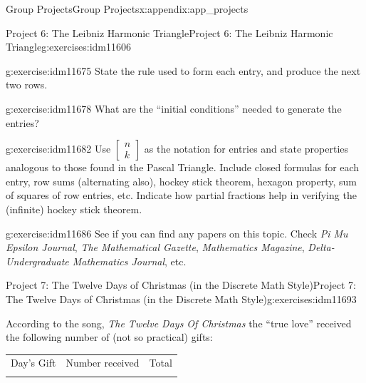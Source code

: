 \documentclass[oneside,10pt,]{book}
\numberwithin{equation}{chapter}
\newcommand{\hrulemedium}{\noalign{\hrule height 0.07em}}
\begin{document}
\begin{appendixptx}{Group Projects}{}{Group Projects}{}{}{x:appendix:app_projects}
\begin{exercises-section-numberless}{Project 6: The Leibniz Harmonic Triangle}{}{Project 6: The Leibniz Harmonic Triangle}{}{}{g:exercises:idm11606}
\begin{sidebyside}{1}{0}{0}{0}
\begin{sbspanel}{1}
{\par}
\end{sbspanel}%
\end{sidebyside}%
\begin{divisionexercise}{1}{}{}{g:exercise:idm11675}%
State the rule used to form each entry, and produce the next two rows.%
\end{divisionexercise}%
\begin{divisionexercise}{2}{}{}{g:exercise:idm11678}%
What are the ``initial conditions'' needed to generate the entries?%
\end{divisionexercise}%
\begin{divisionexercise}{3}{}{}{g:exercise:idm11682}%
Use \(\begin{bmatrix} n\\ k \end{bmatrix}\) as the notation for entries and state properties analogous to those found in the Pascal Triangle. Include closed formulas for each entry, row sums (alternating also), hockey stick theorem, hexagon property, sum of squares of row entries, etc. Indicate how partial fractions help in verifying the (infinite) hockey stick theorem.%
\end{divisionexercise}%
\begin{divisionexercise}{4}{}{}{g:exercise:idm11686}%
See if you can find any papers on this topic. Check \emph{Pi Mu Epsilon Journal}, \emph{The Mathematical Gazette}, \emph{Mathematics Magazine}, \emph{Delta-Undergraduate Mathematics Journal}, etc.%
\end{divisionexercise}%
\end{exercises-section-numberless}
%
%
\typeout{************************************************}
\typeout{************************************************}
%
\begin{exercises-section-numberless}{Project 7: The Twelve Days of Christmas (in the Discrete Math Style)}{}{Project 7: The Twelve Days of Christmas (in the Discrete Math Style)}{}{}{g:exercises:idm11693}
\begin{introduction}{}%
According to the song, \emph{The Twelve Days Of Christmas} the ``true love'' received the following number of (not so practical) gifts:%
\begin{sidebyside}{1}{0.2}{0.2}{0}%
\begin{sbspanel}{0.6}%
{\centering%
\begin{tabular}{lll}
Day's Gift&Number received&Total\tabularnewline\hrulemedium

\end{tabular}}
\end{sbspanel}
\end{sidebyside}
\end{introduction}
\end{exercises-section-numberless}
\end{appendixptx}
\end{document}
